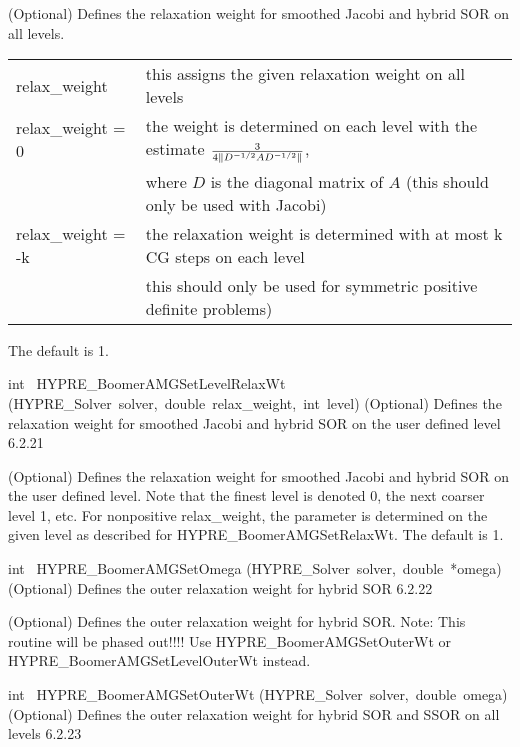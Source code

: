 \documentclass{article}
\begin{document}
\begin{cxxentry}
\begin{cxxentry}
\begin{cxxfunction}
\begin{cxxdoc}
(Optional) Defines the relaxation weight for smoothed Jacobi and hybrid SOR 
on all levels. 

\begin{tabular}{|l|l|} \hline
relax\_weight \> 0 & this assigns the given relaxation weight on all levels \\
relax\_weight = 0 &  the weight is determined on each level
with the estimate $3 \over {4\|D^{-1/2}AD^{-1/2}\|}$,\\
& where $D$ is the diagonal matrix of $A$ (this should only be used with Jacobi) \\
relax\_weight = -k & the relaxation weight is determined with at most k CG steps
on each level \\
& this should only be used for symmetric positive definite problems) \\
\hline
\end{tabular} 

The default is 1.
\end{cxxdoc}
\end{cxxfunction}
\begin{cxxfunction}
{int\ }
        {HYPRE\_BoomerAMGSetLevelRelaxWt}
        {(HYPRE\_Solver\ solver,\ double\ relax\_weight,\ int\ level)}
        {
(Optional) Defines the relaxation weight for smoothed Jacobi and hybrid SOR
on the user defined level}
        {6.2.21}
\begin{cxxdoc}

(Optional) Defines the relaxation weight for smoothed Jacobi and hybrid SOR
on the user defined level. Note that the finest level is denoted 0, the
next coarser level 1, etc. For nonpositive relax\_weight, the parameter is
determined on the given level as described for HYPRE\_BoomerAMGSetRelaxWt. 
The default is 1.
\end{cxxdoc}
\end{cxxfunction}
\begin{cxxfunction}
{int\ }
        {HYPRE\_BoomerAMGSetOmega}
        {(HYPRE\_Solver\ solver,\ double\ *omega)}
        {
(Optional) Defines the outer relaxation weight for hybrid SOR}
        {6.2.22}
\begin{cxxdoc}

(Optional) Defines the outer relaxation weight for hybrid SOR.
Note: This routine will be phased out!!!!
Use HYPRE\_BoomerAMGSetOuterWt or HYPRE\_BoomerAMGSetLevelOuterWt instead.
\end{cxxdoc}
\end{cxxfunction}
\begin{cxxfunction}
{int\ }
        {HYPRE\_BoomerAMGSetOuterWt}
        {(HYPRE\_Solver\ solver,\ double\ omega)}
        {
(Optional) Defines the outer relaxation weight for hybrid SOR and SSOR
on all levels}
        {6.2.23}
\begin{cxxdoc}


\end{cxxdoc}
\end{cxxfunction}
\end{cxxentry}
\end{cxxentry}
\end{document}

